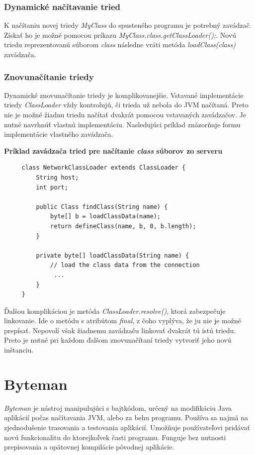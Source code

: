 \documentclass[11pt,final,oneside]{fithesis}
\newenvironment{example}[1]
{
\vspace{3mm}
\noindent\textbf{#1}
\vspace{2mm}
}
{
\vspace{3mm}
}
\begin{document}
\subsection{Dynamické načítavanie tried}
K načítaniu novej triedy \textit{MyClass} do spusteného programu je potrebný 
zavádzač. Získať ho je možné pomocou príkazu 
\textit{MyClass.class.getClassLoader();}.
Novú triedu reprezentovanú súborom \textit{class} následne vráti metóda 
\textit{loadClass(class)} zavádzača.

\subsection{Znovunačítanie triedy}
Dynamické znovunačítanie triedy je komplikovanejšie. Vstavané implementácie 
triedy \textit{ClassLoader} vždy kontrolujú, či trieda už nebola do JVM
načítaná. Preto nie je možné žiadnu triedu načítať dvakrát pomocou vstavaných
zavádzačov. Je nutné navrhnúť vlastnú implementáciu. Nasledujúci príklad 
znázorňuje formu implementácie vlastného zavádzača.

\begin{example}{Príklad zavádzača tried pre načítanie \textit{class} súborov zo
serveru}
\begin{verbatim}
     class NetworkClassLoader extends ClassLoader {
         String host;
         int port;

         public Class findClass(String name) {
             byte[] b = loadClassData(name);
             return defineClass(name, b, 0, b.length);
         }

         private byte[] loadClassData(String name) {
             // load the class data from the connection
              ...
         }
     }
\end{verbatim}
\cite{Oracle:ClassLoader}
\end{example}

Ďalšou komplikáciou je metóda \textit{ClassLoader.resolve()},
ktorá zabezpečuje linkovanie. Ide o metódu s atribútom \textit{final}, z čoho 
vyplýva, že ju nie je možné prepísať. Nepovolí však žiadnemu zavádzaču
linkovať dvakrát tú istú triedu. Preto je nutné pri každom ďalšom
znovunačítaní triedy vytvoriť jeho novú inštanciu.

\chapter{Byteman}
\label{chap:Byteman}

\textit{Byteman} je nástroj manipulujúci s bajtkódom, určený na modifikáciu 
Java aplikácií počas načítavania JVM, alebo za behu programu. 
Používa sa najmä na zjednodušenie trasovania a testovania aplikácií. Umožňuje 
používateľovi pridávať novú funkcionalitu do ktorejkoľvek časti programu.
Funguje bez nutnosti prepisovania a opätovnej kompilácie pôvodnej aplikácie.
\end{document}
